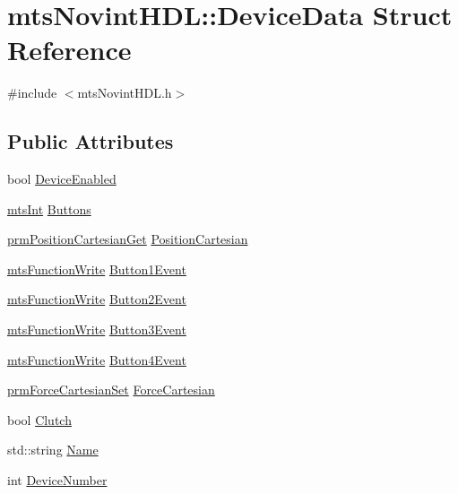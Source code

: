 \hypertarget{structmts_novint_h_d_l_1_1_device_data}{}\section{mts\+Novint\+H\+D\+L\+:\+:Device\+Data Struct Reference}
\label{structmts_novint_h_d_l_1_1_device_data}


{\ttfamily \#include $<$mts\+Novint\+H\+D\+L.\+h$>$}

\subsection*{Public Attributes}
\begin{DoxyCompactItemize}
\item 
bool \hyperlink{structmts_novint_h_d_l_1_1_device_data_afb160710dea5b05f05d1aab53d92336f}{Device\+Enabled}
\item 
\hyperlink{mts_generic_object_proxy_8h_a24374d6f6591267740de73ba87c08d4e}{mts\+Int} \hyperlink{structmts_novint_h_d_l_1_1_device_data_ac44990640b586d8a73e6f75d7c009ca9}{Buttons}
\item 
\hyperlink{classprm_position_cartesian_get}{prm\+Position\+Cartesian\+Get} \hyperlink{structmts_novint_h_d_l_1_1_device_data_ac93b06cca79ba9eeb52df9d2f0931276}{Position\+Cartesian}
\item 
\hyperlink{classmts_function_write}{mts\+Function\+Write} \hyperlink{structmts_novint_h_d_l_1_1_device_data_a59318180ca7f85b1f17fa587d123b432}{Button1\+Event}
\item 
\hyperlink{classmts_function_write}{mts\+Function\+Write} \hyperlink{structmts_novint_h_d_l_1_1_device_data_a0f3d63effcb0c47a8936f07bc2cb21ba}{Button2\+Event}
\item 
\hyperlink{classmts_function_write}{mts\+Function\+Write} \hyperlink{structmts_novint_h_d_l_1_1_device_data_a82bf93fa265ffd336ae0c9947cf5fec1}{Button3\+Event}
\item 
\hyperlink{classmts_function_write}{mts\+Function\+Write} \hyperlink{structmts_novint_h_d_l_1_1_device_data_afb4f5d57acac4ff03d0e6c7ce0f8c637}{Button4\+Event}
\item 
\hyperlink{classprm_force_cartesian_set}{prm\+Force\+Cartesian\+Set} \hyperlink{structmts_novint_h_d_l_1_1_device_data_a0cdc951bd1b42f4f2d600edf415ba181}{Force\+Cartesian}
\item 
bool \hyperlink{structmts_novint_h_d_l_1_1_device_data_a00c1d32b2e1ae4603014566a61b18eb6}{Clutch}
\item 
std\+::string \hyperlink{structmts_novint_h_d_l_1_1_device_data_a680dd117f9b6f0b13ef2142d72c507ff}{Name}
\item 
int \hyperlink{structmts_novint_h_d_l_1_1_device_data_a9bd1b2ab0ac17be34d64b2ad1de156a2}{Device\+Number}
\end{DoxyCompactItemize}


